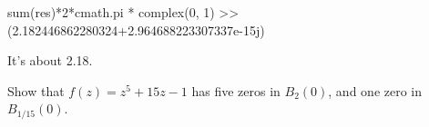 \documentclass{homework}
\begin{document}
\begin{solution}
\begin{code}
                                                                                                           sum(res)*2*cmath.pi * complex(0, 1)
                                                                                                           >> (2.182446862280324+2.964688223307337e-15j)
                                                                                                           \end{code}
                                                                                                           It's about 2.18.
                                                                                                           \end{solution}
                                                                                                           \begin{problem}
                                                                                                             Show that $f(z) = z^5 + 15z - 1$ has five zeros in $B_2(0)$, and one zero in $B_{1/15}(0)$.
                                                                                                             \end{problem}
\end{document}
